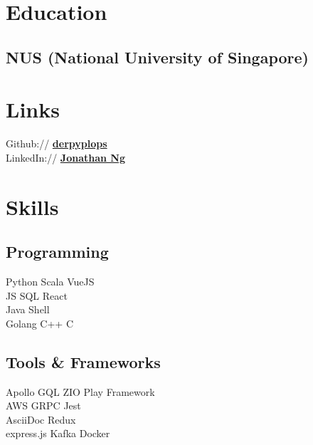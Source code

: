 \documentclass[]{deedy-resume-openfont}
\begin{document}
    \begin{minipage}[t]{0.29\textwidth}
    
    
    \section{Education} 
    
    \subsection{NUS (National University of Singapore)}
    \sectionsep
    
    
    \section{Links} 
    Github:// \href{https://github.com/derpyplops}{\bf derpyplops} \\
    LinkedIn://  \href{https://www.linkedin.com/in/jonathan-ng-7061a3162/}{\bf Jonathan Ng} \\
    
    
    
    
    \section{Skills}
    \subsection{Programming}
    Python \textbullet{} Scala \textbullet{} VueJS  \\ 
    JS  \textbullet{} SQL \textbullet{} React\\
    \vspace{3mm}
    Java\textbullet{} Shell \\ Golang \textbullet{} C++ \textbullet{} C \\
    \sectionsep
    
    \subsection{Tools \& Frameworks}
    Apollo GQL \textbullet{} ZIO \textbullet{} Play Framework \\ AWS \textbullet{} GRPC \textbullet{} Jest \\ AsciiDoc \textbullet{} Redux \\ express.js \textbullet{} Kafka \textbullet{} Docker
    \sectionsep
    

\end{minipage}
\end{document}
